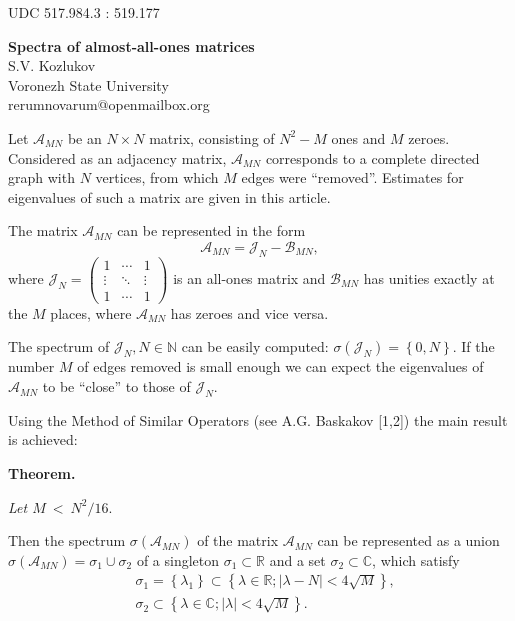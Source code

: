 \documentclass[11pt]{article}
\begin{document}
\small{UDC 517.984.3 : 519.177}

\begin{center}
\textbf{Spectra of almost-all-ones matrices}\\
\small{S.V. Kozlukov} \\
\small{Voronezh State University} \\
\small{rerumnovarum@openmailbox.org} \\
\end{center}

Let \( \mathscr{A}_{MN} \) be an \( N\times N \) matrix,
consisting of \( N^2 - M \) ones and \( M \) zeroes.
Considered as an adjacency matrix,
\( \mathscr{A}_{MN} \) corresponds to a complete directed graph
with \( N \) vertices,
from which \( M \) edges were ``removed''.
Estimates for eigenvalues of such a matrix are given in this article.

The matrix \( \mathscr{A}_{MN} \) can be represented in the form
\[
    \mathscr{A}_{MN} = \mathscr{J}_{N} - \mathscr{B}_{MN},
    \]
where \(
\mathscr{J}_{N} =
\begin{pmatrix}1 & \cdots & 1 \\
\vdots & \ddots & \vdots \\
1 & \cdots & 1
\end{pmatrix} \) is an all-ones matrix
and \( \mathscr{B}_{MN} \) has unities
exactly at the \( M \) places,
where \( \mathscr{A}_{MN} \) has zeroes and vice versa.

The spectrum of \( \mathscr{J}_{N}, N\in\mathbb{N} \) can be easily computed:
\( \sigma\left({\mathscr{J}_{N}}\right) = \left\{0, N \right\} \).
If the number \( M \) of edges removed
is small enough
we can expect the eigenvalues of
\( \mathscr{A}_{MN} \) to be ``close'' to those of \( \mathscr{J}_{N} \).

Using the Method of Similar Operators (see A.G. Baskakov [1,2])
the main result is achieved:

\textbf{Theorem.} {\it
Let
\(M~<~\displaystyle{N^2/16}. \)

Then the spectrum \( \sigma\left({\mathscr{A}_{MN}}\right) \)
of the matrix \( \mathscr{A}_{MN} \)
can be represented as a union \( \sigma\left({\mathscr{A}_{MN}}\right) = \sigma_1 \cup \sigma_2 \)
of a singleton \( \sigma_1 \subset \mathbb{R} \)
and a set \( \sigma_2 \subset \mathbb{C} \),
which satisfy
\begin{equation*}\begin{aligned}
    & \sigma_1 = \left\{ \lambda_1 \right\}
      \subset \left\{ \lambda\in\mathbb{R}; \lvert \lambda - N\rvert < 4\sqrt{M} \right\}, \\
    & \sigma_2 \subset \left\{\lambda\in\mathbb{C}; \lvert\lambda\rvert <4\sqrt{M} \right\}. \\
\end{aligned}\end{equation*}
}
\end{document}
